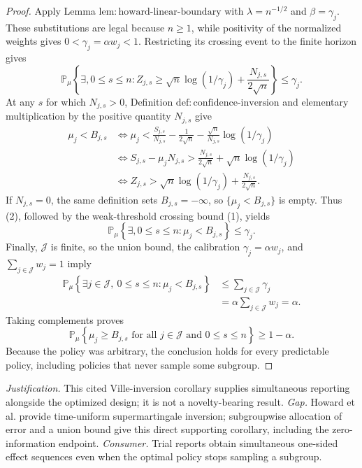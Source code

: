 \documentclass{article}
\begin{document}
\begin{proof}
Apply Lemma \(\mathrm{lem{:}howard\mbox{-}linear\mbox{-}boundary}\) with \(\lambda=n^{-1/2}\) and \(\beta=\gamma_j\).  These substitutions are legal because \(n\geq1\), while positivity of the normalized weights gives \(0<\gamma_j=\alpha w_j<1\).  Restricting its crossing event to the finite horizon gives
\[
\mathbb P_\mu\!\left\{\exists,0\leq s\leq n:
Z_{j,s}\geq \sqrt n\log(1/\gamma_j)+\frac{N_{j,s}}{2\sqrt n}\right\}
\leq\gamma_j.
\tag{1}
\]
At any \(s\) for which \(N_{j,s}>0\), Definition \(\mathrm{def{:}confidence\mbox{-}inversion}\) and elementary multiplication by the positive quantity \(N_{j,s}\) give
\[
\begin{aligned}
\mu_j<B_{j,s}
&\iff
\mu_j<\frac{S_{j,s}}{N_{j,s}}-\frac{1}{2\sqrt n}
-\frac{\sqrt n}{N_{j,s}}\log(1/\gamma_j)\\
&\iff
S_{j,s}-\mu_jN_{j,s}>
\frac{N_{j,s}}{2\sqrt n}+\sqrt n\log(1/\gamma_j)\\
&\iff
Z_{j,s}>
\sqrt n\log(1/\gamma_j)+\frac{N_{j,s}}{2\sqrt n}.
\end{aligned}
\tag{2}
\]
If \(N_{j,s}=0\), the same definition sets \(B_{j,s}=-\infty\), so \(\{\mu_j<B_{j,s}\}\) is empty.  Thus (2), followed by the weak-threshold crossing bound (1), yields
\[
\mathbb P_\mu\!\left\{\exists,0\leq s\leq n:\mu_j<B_{j,s}\right\}\leq\gamma_j.
\tag{3}
\]
Finally, \(\mathcal J\) is finite, so the union bound, the calibration \(\gamma_j=\alpha w_j\), and \(\sum_{j\in\mathcal J}w_j=1\) imply
\[
\begin{aligned}
\mathbb P_\mu\!\left\{\exists j\in\mathcal J,\ 0\leq s\leq n:
\mu_j<B_{j,s}\right\}
&\leq\sum_{j\in\mathcal J}\gamma_j\\
&=\alpha\sum_{j\in\mathcal J}w_j
=\alpha.
\end{aligned}
\]
Taking complements proves
\[
\mathbb P_\mu\!\left\{\mu_j\geq B_{j,s}
\text{ for all }j\in\mathcal J\text{ and }0\leq s\leq n\right\}
\geq1-\alpha.
\]
Because the policy was arbitrary, the conclusion holds for every predictable policy, including policies that never sample some subgroup.
\end{proof}
\par\smallskip\noindent \textit{Justification.} This cited Ville-inversion corollary supplies simultaneous reporting alongside the optimized design; it is not a novelty-bearing result. \textit{Gap.} Howard et al. provide time-uniform supermartingale inversion; subgroupwise allocation of error and a union bound give this direct supporting corollary, including the zero-information endpoint. \textit{Consumer.} Trial reports obtain simultaneous one-sided effect sequences even when the optimal policy stops sampling a subgroup.
\end{document}
